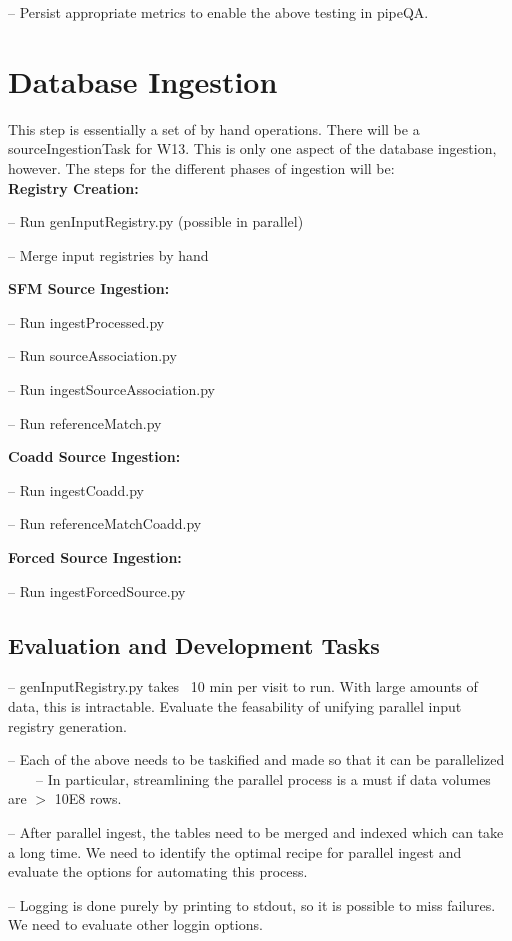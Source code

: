 \documentclass[prd, nofootinbib, floatfix, 11pt,tightenlines,times]{article}
\begin{document}
-- Persist appropriate metrics to enable the above testing in pipeQA.


\clearpage 
\section{Database Ingestion} 
This step is essentially a set of by hand operations.  
There will be a sourceIngestionTask for W13.  This is only one aspect of the
database ingestion, however.  The steps for the different phases of ingestion will be:\\
{\bf Registry Creation:}

-- Run genInputRegistry.py (possible in parallel)

-- Merge input registries by hand

{\bf SFM Source Ingestion:}

-- Run ingestProcessed.py

-- Run sourceAssociation.py

-- Run ingestSourceAssociation.py

-- Run referenceMatch.py

{\bf Coadd Source Ingestion:}

-- Run ingestCoadd.py

-- Run referenceMatchCoadd.py

{\bf Forced Source Ingestion:}

-- Run ingestForcedSource.py

\subsection{Evaluation and Development Tasks}
-- genInputRegistry.py takes ~10 min per visit to run.  With large amounts of data, this is intractable.  Evaluate the feasability of unifying parallel input registry generation.

-- Each of the above needs to be taskified and made so that it can be parallelized
~~~~-- In particular, streamlining the parallel process is a must if data volumes are $>$ 10E8 rows.

-- After parallel ingest, the tables need to be merged and indexed which can take a long time.  We need to identify the optimal recipe for parallel ingest and evaluate the options for automating this process.

-- Logging is done purely by printing to stdout, so it is possible to miss failures.  We need to evaluate other loggin options.
\end{document}
